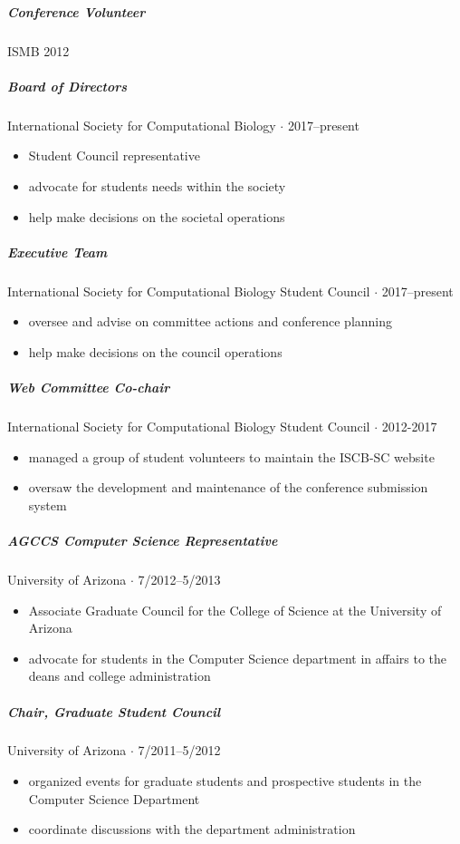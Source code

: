\documentclass[10pt,letterpaper]{article}
\begin{document}
\subparagraph{Conference Volunteer}
ISMB 2012

\subparagraph{Board of Directors}
International Society for Computational Biology  $\cdot$ 2017--present
\begin{itemize}
    \item Student Council representative 
    \item advocate for students needs within the society
    \item help make decisions on the societal operations
\end{itemize}

\subparagraph{Executive Team}
International Society for Computational Biology Student Council $\cdot$ 2017--present
\begin{itemize} 
    \item oversee and advise on committee actions and conference planning 
    \item help make decisions on the council operations
\end{itemize}

\subparagraph{Web Committee Co-chair}
International Society for Computational Biology Student Council  $\cdot$ 2012-2017
\begin{itemize}
    \item managed a group of student volunteers to maintain the ISCB-SC website
    \item oversaw the development and maintenance of the conference submission system
\end{itemize}

\subparagraph{AGCCS Computer Science Representative}
University of Arizona $\cdot$ 7/2012--5/2013
\begin{itemize}
    \item Associate Graduate Council for the College of Science at the University of Arizona
    \item advocate for students in the Computer Science department in affairs to the deans and college administration
\end{itemize}

\subparagraph{Chair, Graduate Student Council}
University of Arizona $\cdot$ 7/2011--5/2012
\begin{itemize}
    \item organized events for graduate students and prospective students in the Computer Science Department
    \item coordinate discussions with the department administration
\end{itemize}
\end{document}
